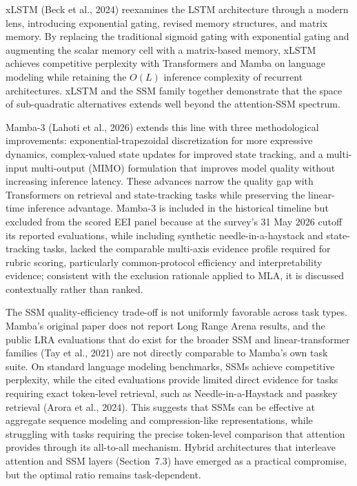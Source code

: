 \documentclass[10pt,twocolumn]{article}
\begin{document}
xLSTM (Beck et al., 2024) reexamines the LSTM architecture through a modern lens, introducing exponential gating, revised memory structures, and matrix memory. By replacing the traditional sigmoid gating with exponential gating and augmenting the scalar memory cell with a matrix-based memory, xLSTM achieves competitive perplexity with Transformers and Mamba on language modeling while retaining the $O(L)$ inference complexity of recurrent architectures. xLSTM and the SSM family together demonstrate that the space of sub-quadratic alternatives extends well beyond the attention-SSM spectrum.

Mamba-3 (Lahoti et al., 2026) extends this line with three methodological improvements: exponential-trapezoidal discretization for more expressive dynamics, complex-valued state updates for improved state tracking, and a multi-input multi-output (MIMO) formulation that improves model quality without increasing inference latency. These advances narrow the quality gap with Transformers on retrieval and state-tracking tasks while preserving the linear-time inference advantage. Mamba-3 is included in the historical timeline but excluded from the scored EEI panel because at the survey's 31 May 2026 cutoff its reported evaluations, while including synthetic needle-in-a-haystack and state-tracking tasks, lacked the comparable multi-axis evidence profile required for rubric scoring, particularly common-protocol efficiency and interpretability evidence; consistent with the exclusion rationale applied to MLA, it is discussed contextually rather than ranked.

The SSM quality-efficiency trade-off is not uniformly favorable across task types. Mamba's original paper does not report Long Range Arena results, and the public LRA evaluations that do exist for the broader SSM and linear-transformer families (Tay et al., 2021) are not directly comparable to Mamba's own task suite. On standard language modeling benchmarks, SSMs achieve competitive perplexity, while the cited evaluations provide limited direct evidence for tasks requiring exact token-level retrieval, such as Needle-in-a-Haystack and passkey retrieval (Arora et al., 2024). This suggests that SSMs can be effective at aggregate sequence modeling and compression-like representations, while struggling with tasks requiring the precise token-level comparison that attention provides through its all-to-all mechanism. Hybrid architectures that interleave attention and SSM layers (Section~7.3) have emerged as a practical compromise, but the optimal ratio remains task-dependent.
\end{document}
